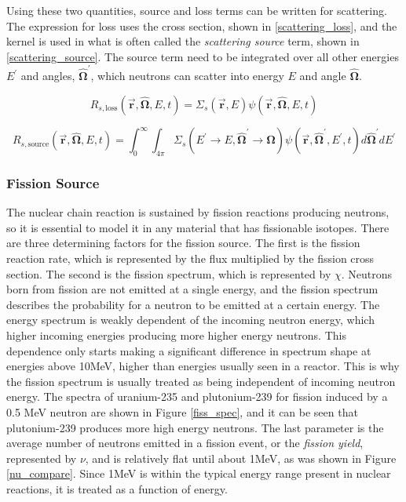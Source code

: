 Using these two quantities, source and loss terms can be written for scattering.  The expression for loss uses the cross section, shown in \eqref{scattering_loss}, and the kernel is used in what is often called the \emph{scattering source} term, shown in \eqref{scattering_source}.  The source term need to be integrated over all other energies $E^\prime$ and angles, $\boldsymbol{\hat{\Omega}}^\prime$, which neutrons can scatter into energy $E$ and angle $\boldsymbol{\hat{\Omega}}$.

\begin{equation}
\label{scattering_loss}
R_{s, \mathrm{loss}}( \boldsymbol{\vec{r}},\boldsymbol{\hat{\Omega}},E,t ) = \Sigma_s (\boldsymbol{\vec{r}},E) \psi(\boldsymbol{\vec{r}},\boldsymbol{\hat{\Omega}},E,t)
 \end{equation}
 
 \begin{equation}
\label{scattering_source}
R_{s, \mathrm{source}}(\boldsymbol{\vec{r}},\boldsymbol{\hat{\Omega}},E,t) = \int_0^\infty  \int_{4\pi} \Sigma_s(E^\prime \rightarrow E,\boldsymbol{\hat{\Omega}}^\prime \rightarrow \boldsymbol{\hat{\Omega}}) \psi(\boldsymbol{\vec{r}},\boldsymbol{\hat{\Omega}}^\prime,E^\prime,t) d\boldsymbol{\hat{\Omega}}^\prime dE^\prime
 \end{equation}
 
 \subsubsection{Fission Source}

The nuclear chain reaction is sustained by fission reactions producing neutrons, so it is essential to model it in any material that has fissionable isotopes.  There are three determining factors for the fission source.  The first is the fission reaction rate, which is represented by the flux multiplied by the fission cross section.  The second is the fission spectrum, which is represented by $\chi$.  Neutrons born from fission are not emitted at a single energy, and the fission spectrum describes the probability for a neutron to be emitted at a certain energy.  The energy spectrum is weakly dependent of the incoming neutron energy, which higher incoming energies producing more higher energy neutrons.  This dependence only starts making a significant difference in spectrum shape at energies above 10MeV, higher than energies usually seen in a reactor.  This is why the fission spectrum is usually treated as being independent of incoming neutron energy.  The spectra of uranium-235 and plutonium-239 for fission induced by a 0.5 MeV neutron are shown in Figure \ref{fiss_spec}, and it can be seen that plutonium-239 produces more high energy neutrons.  The last parameter is the average number of neutrons emitted in a fission event, or the \emph{fission yield}, represented by $\nu$, and is relatively flat until about 1MeV, as was shown in Figure \ref{nu_compare}.  Since 1MeV is within the typical energy range present in nuclear reactions, it is treated as a function of energy.

